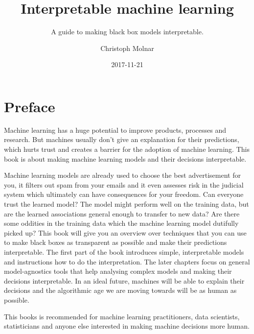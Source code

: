 \documentclass[12pt,]{krantz}
\title{Interpretable machine learning}
\subtitle{A guide to making black box models interpretable.}
\author{Christoph Molnar}
\date{2017-11-21}
\theoremstyle{definition}
\theoremstyle{definition}
\theoremstyle{definition}
\theoremstyle{remark}
\begin{document}
\maketitle



\setlength{\abovedisplayskip}{-5pt}
\setlength{\abovedisplayshortskip}{-5pt}

{
\hypersetup{linkcolor=black}
\setcounter{tocdepth}{1}
\tableofcontents
}
\chapter*{Preface}\label{preface}

Machine learning has a huge potential to improve products, processes and
research. But machines usually don't give an explanation for their
predictions, which hurts trust and creates a barrier for the adoption of
machine learning. This book is about making machine learning models and
their decisions interpretable.

Machine learning models are already used to choose the best
advertisement for you, it filters out spam from your emails and it even
assesses risk in the judicial system which ultimately can have
consequences for your freedom. Can everyone trust the learned model? The
model might perform well on the training data, but are the learned
associations general enough to transfer to new data? Are there some
oddities in the training data which the machine learning model dutifully
picked up? This book will give you an overview over techniques that you
can use to make black boxes as transparent as possible and make their
predictions interpretable. The first part of the book introduces simple,
interpretable models and instructions how to do the interpretation. The
later chapters focus on general model-agnostics tools that help
analysing complex models and making their decisions interpretable. In an
ideal future, machines will be able to explain their decisions and the
algorithmic age we are moving towards will be as human as possible.

This books is recommended for machine learning practitioners, data
scientists, statisticians and anyone else interested in making machine
decisions more human.
\end{document}
